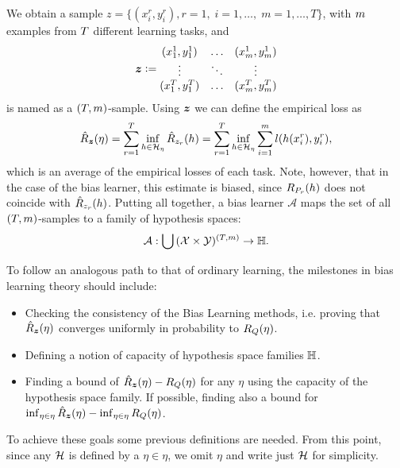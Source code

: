We obtain a sample $z=\{(x_i^r, y_i^r), r=1,\; i=1, \ldots, \;m=1, \ldots, T\}$, with $m$ examples from $T$ different learning tasks, and
\begin{equation}
    \nonumber
    \bm{z} \vcentcolon= 
    \begin{matrix}
        (x_1^1, y_1^1) & \ldots & (x_m^1, y_m^1) \\
        \vdots & \ddots & \vdots \\
        (x_1^T, y_1^T) & \ldots & (x_m^T, y_m^T) \\
    \end{matrix}
\end{equation}
is named as a $(T, m)$-sample.
Using $\bm{z}$ we can define the empirical loss as
\begin{equation}\label{eq:biaslearn_emprisk}
    \bemprisk(\eta) = \sum_{r=1}^\ntasks \inf_{\hypf \in \hypspace_\eta} \hat{\risk}_{\sample_r}(\hypf) = \sum_{r=1}^\ntasks \inf_{\hypf \in \hypspace_\eta} \sum_{i=1}^m l(\hypf(x_i^r), y_i^r),
\end{equation}
which is an average of the empirical losses of each task. 
Note, however, that in the case of the bias learner, this estimate is biased, since $R_{P_r}(h)$ does not coincide with $\hat{R}_{z_r}(h)$. 
Putting all together, a bias learner $\mathcal{A}$ maps the set of all $(T, m)$-samples to a family of hypothesis spaces:
\begin{equation}
    \nonumber
    \mathcal{A} : \bigcup {(\mathcal{X}\times \mathcal{Y})^{(T, m)}} \to \mathbb{H}.
\end{equation}
%

To follow an analogous path to that of ordinary learning, the milestones in bias learning theory should include:
\begin{itemize}
    \item Checking the consistency of the Bias Learning methods, i.e. proving that $\hat{R}_{\bm{z}}(\eta)$ converges uniformly in probability to $R_Q(\eta)$.
    \item Defining a notion of capacity of hypothesis space families $\mathbb{H}$.
    \item Finding a bound of $\hat{R}_{\bm{z}}(\eta) - R_Q(\eta)$ for any $\eta$ using the capacity of the hypothesis space family. If possible, finding also a bound for $\inf_{\eta \in \eta}\hat{R}_{\bm{z}}(\eta) - \inf_{\eta \in \eta} R_Q(\eta)$.
\end{itemize}
To achieve these goals some previous definitions are needed. From this point, since any $\mathcal{H}$ is defined by a $\eta \in \eta$, we omit $\eta$ and write just $\mathcal{H}$ for simplicity.
%
